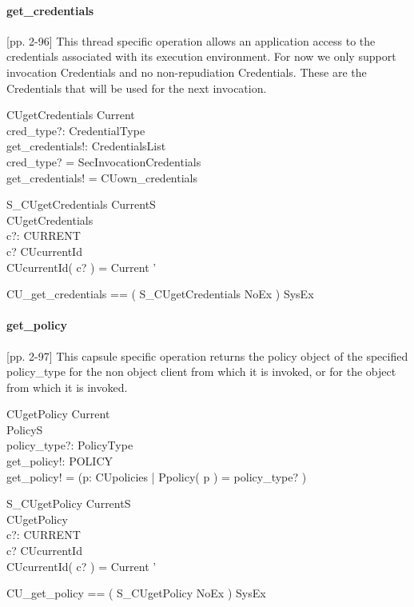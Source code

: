 \paragraph{get\_credentials}
[pp. 2-96] This thread specific operation allows an application access to the
credentials associated with its execution environment.  For now we only support
invocation Credentials and no non-repudiation Credentials.  These are the
Credentials that will be used for the next invocation.
\begin{schema}{CUgetCredentials}
  \Xi Current \\
  cred\_type?: CredentialType \\
  get\_credentials!: CredentialsList \\
  \where
  cred\_type? = SecInvocationCredentials \\
  get\_credentials! = CUown\_credentials \\
\end{schema}
\begin{schema}{S\_CUgetCredentials}
  \Xi CurrentS \\
  CUgetCredentials \\
  c?: CURRENT \\
  \where
  c? \in \dom CUcurrentId \\ 

  CUcurrentId( c? ) = \theta Current ' \\
\end{schema}
\begin{zed}
  CU\_get\_credentials == ( S\_CUgetCredentials \land NoEx ) \lor SysEx
\end{zed}


\paragraph{get\_policy}
[pp. 2-97] This capsule specific operation returns the policy object of the
specified policy\_type for the non \corba{} object client from which it is
invoked, or for the \corba{} object from which it is invoked.
\begin{schema}{CUgetPolicy}
  \Xi Current \\
  \Xi PolicyS \\
  policy\_type?: PolicyType \\
  get\_policy!: POLICY \\
  \where
  get\_policy! = (\mu p: CUpolicies | Ppolicy( p ) = policy\_type? ) \\
\end{schema}
\begin{schema}{S\_CUgetPolicy}
  \Xi CurrentS \\
  CUgetPolicy \\
  c?: CURRENT \\
  \where
  c? \in \dom CUcurrentId \\ 

  CUcurrentId( c? ) = \theta Current ' \\
\end{schema}
\begin{zed}
  CU\_get\_policy == ( S\_CUgetPolicy \land NoEx ) \lor SysEx
\end{zed}



